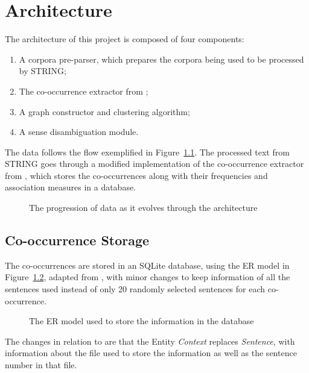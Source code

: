 \chapter{Architecture}
\label{sec:architecture}

The architecture of this project is composed of four components:

\begin{enumerate}
  \item A corpora pre-parser, which prepares the corpora being used to be
processed by \ac{STRING};
  \item The co-occurrence extractor from \cite{correia2015syntax};
  \item A graph constructor and clustering algorithm;
  \item A sense disambiguation module.
\end{enumerate}

The data follows the flow exemplified in Figure~\ref{fig:data-progression}. The
processed text from \ac{STRING} goes through a modified implementation of the
co-occurrence extractor from \cite{correia2015syntax}, which stores the
co-occurrences along with their frequencies and association measures in a
database.

\begin{figure}[h]
 \centering
 
 \caption{The progression of data as it evolves through the architecture}
 \label{fig:data-progression}
\end{figure}

\section{Co-occurrence Storage}

The co-occurrences are stored in an SQLite database, using the \ac{ER} model in
Figure~\ref{fig:er-model}, adapted from \cite{correia2015syntax}, with minor
changes to keep information of all the sentences used instead of only 20
randomly selected sentences for each co-occurrence.

\begin{figure}[h]
  \centering
  
  \caption{The \acl*{ER} model used to store the information in the database}
  \label{fig:er-model}
\end{figure}

The changes in relation to \cite{correia2015syntax} are that the Entity
\emph{Context} replaces \emph{Sentence}, with information about the file used to
store the information as well as the sentence number in that file.

